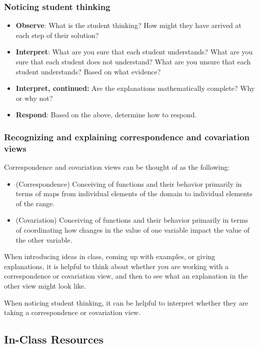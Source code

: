 \documentclass[11pt]{article}
\newcommand\header[1]{\vspace*{4pt}\par {\large {\bf #1}}\par}
\theoremstyle{definition}
\begin{document}
\subsubsection*{Noticing student thinking}
\begin{itemize}
\item {\bf Observe}: What is the student thinking? How might they have arrived at each step of their solution?
\item {\bf Interpret}: What are you sure that each student understands? What are you sure that each student
does not understand? What are you unsure that each student understands?  Based on what evidence?	
\item {\bf Interpret, continued:} Are the explanations mathematically complete? Why or why not?
\item {\bf Respond}: Based on the above, determine how to respond.
\end{itemize}


\subsubsection*{Recognizing and explaining correspondence and covariation views}

Correspondence and covariation views can be thought of as the following:
\begin{itemize}
	\item (Correspondence) Conceiving of functions and their behavior primarily in terms of maps from individual elements of the domain to individual elements of the range. 
	\item (Covariation) Conceiving of functions and their behavior primarily in terms of coordinating how changes in the value of one variable impact the value of the other variable.
\end{itemize}

When introducing ideas in class, coming up with examples, or giving explanations, it is helpful to think about whether you are working with a correspondence or covariation view, and then to see what an explanation in the other view might look like. 

When noticing student thinking, it can be helpful to interpret whether they are taking a correspondence or covariation view.

\newpage
\subsection{In-Class Resources}
\end{document}

